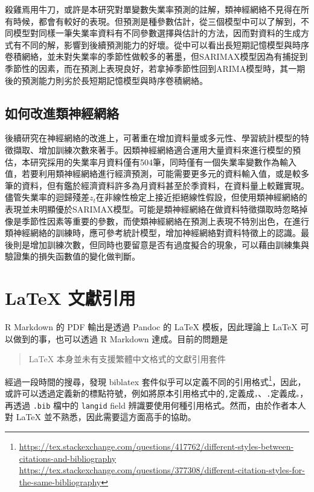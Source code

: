 \documentclass[oneside]{book}
\renewcommand{\appendixname}{附錄}
\begin{document}
殺雞焉用牛刀，或許是本研究對單變數失業率預測的註解，類神經網絡不見得在所有時候，都會有較好的表現。但預測是種參數估計，從三個模型中可以了解到，不同模型對同樣一筆失業率資料有不同參數選擇與估計的方法，因而對資料的生成方式有不同的解，影響到後續預測能力的好壞。從中可以看出長短期記憶模型與時序卷積網絡，並未對失業率的季節性做較多的著墨，但SARIMAX模型因為有捕捉到季節性的因素，而在預測上表現良好，若拿掉季節性回到ARIMA模型時，其一期後的預測能力則劣於長短期記憶模型與時序卷積網絡。

\hypertarget{ux5982ux4f55ux6539ux9032ux985eux795eux7d93ux7db2ux7d61}{%
\section{如何改進類神經網絡}\label{ux5982ux4f55ux6539ux9032ux985eux795eux7d93ux7db2ux7d61}}

後續研究在神經網絡的改進上，可著重在增加資料量或多元性、學習統計模型的特徵擷取、增加訓練次數來著手。因類神經網絡適合運用大量資料來進行模型的預估，本研究採用的失業率月資料僅有504筆，同時僅有一個失業率變數作為輸入值，若要利用類神經網絡進行經濟預測，可能需要更多元的資料輸入值，或是較多筆的資料，但有鑑於經濟資料許多為月資料甚至於季資料，在資料量上較難實現。儘管失業率的迴歸殘差\(z_t\)在非線性檢定上接近拒絕線性假設，但使用類神經網絡的表現並未明顯優於SARIMAX模型。可能是類神經網絡在做資料特徵擷取時忽略掉像是季節性因素等重要的參數，而使類神經網絡在預測上表現不特別出色，在進行類神經網絡的訓練時，應可參考統計模型，增加神經網絡對資料特徵上的認識。最後則是增加訓練次數，但同時也要留意是否有過度擬合的現象，可以藉由訓練集與驗證集的損失函數值的變化做判斷。

\hypertarget{appendix-ux9644ux9304}{%
\appendix \addcontentsline{toc}{chapter}{\appendixname}}


\hypertarget{latex-cite-pkg}{%
\chapter{LaTeX 文獻引用}\label{latex-cite-pkg}}

R Markdown 的 PDF 輸出是透過 Pandoc 的 LaTeX 模板，因此理論上 LaTeX 可以做到的事，也可以透過 R Markdown 達成。目前的問題是

\begin{quote}
LaTeX 本身並未有支援繁體中文格式的文獻引用套件
\end{quote}

經過一段時間的搜尋，發現 biblatex 套件似乎可以定義不同的引用格式\footnote{\url{https://tex.stackexchange.com/questions/417762/different-styles-between-citations-and-bibliography}~\\
  \url{https://tex.stackexchange.com/questions/377308/different-citation-styles-for-the-same-bibliography}}，因此，或許可以透過定義新的標點符號，例如將原本引用格式中的\texttt{,}定義成\texttt{，}、\texttt{.}定義成\texttt{。}，再透過 \texttt{.bib} 檔中的 \texttt{langid} field 辨識要使用何種引用格式。然而，由於作者本人對 LaTeX 並不熟悉，因此需要這方面高手的協助。
\end{document}
